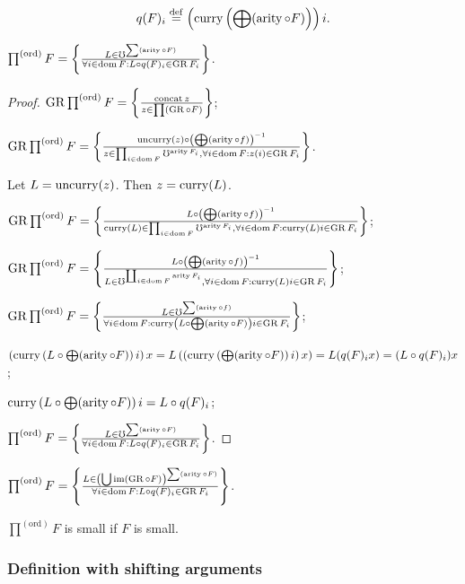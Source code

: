 \[ q(F)_{i}\overset{\mathrm{def}}{=}\left(\operatorname{curry}\left(\bigoplus(\operatorname{arity}\circ F)\right)\right)i. \]
\begin{prop}
$\prod^{\mathrm{(ord)}}F=\left\{ \frac{L\in\mho^{\sum(\operatorname{arity}\circ F)}}{\forall i\in\operatorname{dom} F:L\circ q(F)_{i}\in\operatorname{GR} F_{i}}\right\}$.\end{prop}
\begin{proof}
$\operatorname{GR}\prod^{\mathrm{(ord)}}F=\left\{ \frac{\operatorname{concat} z}{z\in\prod(\operatorname{GR}\circ F)}\right\}$;

$\operatorname{GR}\prod^{\mathrm{(ord)}}F=\left\{ \frac{\operatorname{uncurry}(z)\circ\left(\bigoplus(\operatorname{arity}\circ f)\right)^{-1}}{z\in\prod_{i\in\operatorname{dom} F}\mho^{\operatorname{arity} F_{i}},\forall i\in\operatorname{dom} F:z(i)\in\operatorname{GR} F_{i}}\right\}$.

Let $L=\operatorname{uncurry}(z)$. Then $z=\operatorname{curry}(L)$.

$\operatorname{GR}\prod^{\mathrm{(ord)}}F=\left\{ \frac{L\circ\left(\bigoplus(\operatorname{arity}\circ f)\right)^{-1}}{\operatorname{curry}(L)\in\prod_{i\in\operatorname{dom} F}\mho^{\operatorname{arity} F_{i}},\forall i\in\operatorname{dom} F:\operatorname{curry}(L)i\in\operatorname{GR} F_{i}}\right\}$;

$\operatorname{GR}\prod^{\mathrm{(ord)}}F=\left\{ \frac{L\circ\left(\bigoplus(\operatorname{arity}\circ f)\right)^{-1}}{L\in\mho^{\coprod_{i\in\operatorname{dom} F}\operatorname{arity} F_{i}},\forall i\in\operatorname{dom} F:\operatorname{curry}(L)i\in\operatorname{GR} F_{i}}\right\}$;

$\operatorname{GR}\prod^{\mathrm{(ord)}}F=\left\{ \frac{L\in\mho^{\sum(\operatorname{arity}\circ f)}}{\forall i\in\operatorname{dom} F:\operatorname{curry}\left(L\circ\bigoplus(\operatorname{arity}\circ F)\right)i\in\operatorname{GR} F_{i}}\right\}$;

$\left(\operatorname{curry}\left(L\circ\bigoplus(\operatorname{arity}\circ F)\right)i\right)x=L\left(\left(\operatorname{curry}\left(\bigoplus(\operatorname{arity}\circ F)\right)i\right)x\right)=L(q(F)_{i}x)=(L\circ q(F)_{i})x$;

$\operatorname{curry}\left(L\circ\bigoplus(\operatorname{arity}\circ F)\right)i=L\circ q(F)_{i}$;

$\prod^{\mathrm{(ord)}}F=\left\{ \frac{L\in\mho^{\sum(\operatorname{arity}\circ F)}}{\forall i\in\operatorname{dom} F:L\circ q(F)_{i}\in\operatorname{GR} F_{i}}\right\}$.\end{proof}
\begin{cor}
$\prod^{\mathrm{(ord)}}F=\left\{ \frac{L\in\left(\bigcup\operatorname{im}(\operatorname{GR}\circ F)\right)^{\sum(\operatorname{arity}\circ F)}}{\forall i\in\operatorname{dom} F:L\circ q(F)_{i}\in\operatorname{GR} F_{i}}\right\}$.
\end{cor}

\begin{cor}
$\prod^{\mathrm{(ord)}}F$ is small if $F$ is small.
\end{cor}

\subsubsection{Definition with shifting arguments}

